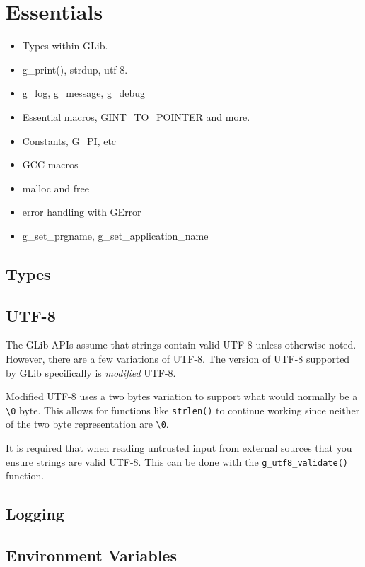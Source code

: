 \chapter{Essentials}

\begin{itemize}
\item Types within GLib.
\item g\_print(), strdup, utf-8.
\item g\_log, g\_message, g\_debug
\item Essential macros, GINT\_TO\_POINTER and more.
\item Constants, G\_PI, etc
\item GCC macros
\item malloc and free
\item error handling with GError
\item g\_set\_prgname, g\_set\_application\_name
\end{itemize}

\section{Types}

\section{UTF-8}

The GLib APIs assume that strings contain valid UTF-8 unless otherwise noted.
However, there are a few variations of UTF-8.
The version of UTF-8 supported by GLib specifically is \emph{modified} UTF-8.

Modified UTF-8 uses a two bytes variation to support what would normally be a \verb|\0| byte.
This allows for functions like \verb|strlen()| to continue working since neither of the two byte representation are \verb|\0|.

It is required that when reading untrusted input from external sources that you ensure strings are valid UTF-8.
This can be done with the \verb|g_utf8_validate()| function.

\section{Logging}

\section{Environment Variables}


